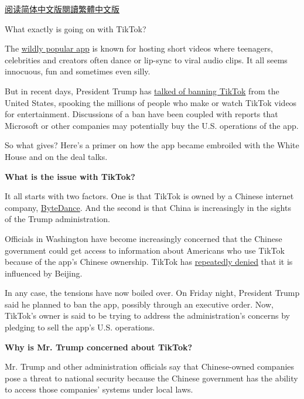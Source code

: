 \href{https://cn.nytimes.com/technology/20200803/tiktok-trump-microsoft-bytedance-china-ban/}{阅读简体中文版}\href{https://cn.nytimes.com/technology/20200803/tiktok-trump-microsoft-bytedance-china-ban/zh-hant/}{閱讀繁體中文版}

What exactly is going on with TikTok?

The
\href{https://www.nytimes.com/2020/06/03/technology/tiktok-is-the-future.html}{wildly
popular app} is known for hosting short videos where teenagers,
celebrities and creators often dance or lip-sync to viral audio clips.
It all seems innocuous, fun and sometimes even silly.

But in recent days, President Trump has
\href{https://www.nytimes.com/2020/07/31/technology/tiktok-microsoft.html}{talked
of banning TikTok} from the United States, spooking the millions of
people who make or watch TikTok videos for entertainment. Discussions of
a ban have been coupled with reports that Microsoft or other companies
may potentially buy the U.S. operations of the app.

So what gives? Here's a primer on how the app became embroiled with the
White House and on the deal talks.

\textbf{What is the issue with TikTok?}

It all starts with two factors. One is that TikTok is owned by a Chinese
internet company,
\href{https://www.nytimes.com/2018/10/29/technology/bytedance-app-funding-china.html}{ByteDance}.
And the second is that China is increasingly in the sights of the Trump
administration.

Officials in Washington have become increasingly concerned that the
Chinese government could get access to information about Americans who
use TikTok because of the app's Chinese ownership. TikTok has
\href{https://www.nytimes.com/2019/11/18/technology/tiktok-alex-zhu-interview.html}{repeatedly
denied} that it is influenced by Beijing.

In any case, the tensions have now boiled over. On Friday night,
President Trump said he planned to ban the app, possibly through an
executive order. Now, TikTok's owner is said to be trying to address the
administration's concerns by pledging to sell the app's U.S. operations.

\textbf{Why is Mr. Trump concerned about TikTok?}

Mr. Trump and other administration officials say that Chinese-owned
companies pose a threat to national security because the Chinese
government has the ability to access those companies' systems under
local laws.

